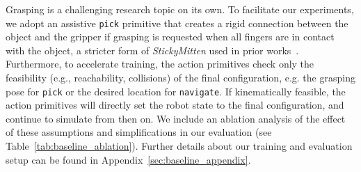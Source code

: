 Grasping is a challenging research topic on its own. To facilitate our experiments, we adopt an assistive \texttt{pick} primitive that creates a rigid connection between the object and the gripper if grasping is requested when all fingers are in contact with the object, a stricter form of \textit{StickyMitten} used in prior works~\cite{szot2021habitat, ehsani2021manipulathor, li2020hrl4in}. Furthermore, to accelerate training, %
the action primitives check only the feasibility (e.g., reachability, collisions) of the final configuration, e.g. the grasping pose for \texttt{pick} or the desired location for \texttt{navigate}. If kinematically feasible, the action primitives will directly set the robot state to the final configuration, and continue to simulate from then on. We include an ablation analysis of the effect of these assumptions and simplifications in our evaluation (see Table~\ref{tab:baseline_ablation}).
Further details about our training and evaluation setup can be found in Appendix~\ref{sec:baseline_appendix}.


